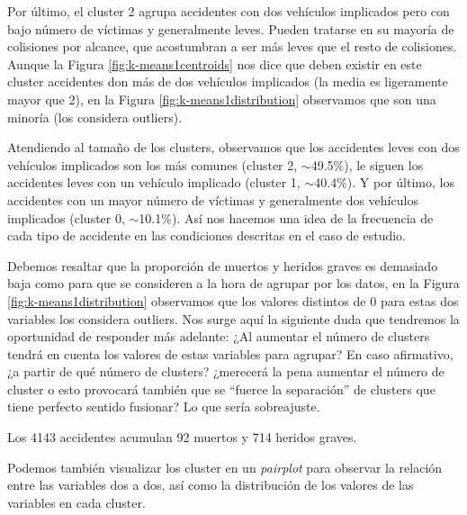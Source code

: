 \documentclass[oneside]{book}
\begin{document}
Por último, el cluster 2 agrupa accidentes con dos vehículos
implicados pero con bajo número de víctimas y generalmente
leves. Pueden tratarse en su mayoría de colisiones por alcance, que
acostumbran a ser más leves que el resto de colisiones. Aunque la
Figura \ref{fig:k-means1centroids} nos dice que deben existir en este
cluster accidentes don más de dos vehículos implicados (la media es
ligeramente mayor que 2), en la Figura \ref{fig:k-means1distribution}
observamos que son una minoría (los considera outliers).

Atendiendo al tamaño de los clusters, observamos que los accidentes
leves con dos vehículos implicados son los más comunes (cluster 2,
$\sim$49.5\%), le siguen los accidentes leves con un vehículo
implicado (cluster 1, $\sim$40.4\%). Y por último, los accidentes con
un mayor número de víctimas y generalmente dos vehículos implicados
(cluster 0, $\sim$10.1\%). Así nos hacemos una idea de la frecuencia
de cada tipo de accidente en las condiciones descritas en el caso de
estudio.

Debemos resaltar que la proporción de muertos y heridos graves es
demasiado baja como para que se consideren a la hora de agrupar por
los datos, en la Figura \ref{fig:k-means1distribution} observamos que
los valores distintos de 0 para estas dos variables los considera
outliers. Nos surge aquí la siguiente duda que tendremos la
oportunidad de responder más adelante: ¿Al aumentar el número de
clusters tendrá en cuenta los valores de estas variables para agrupar?
En caso afirmativo, ¿a partir de qué número de clusters? ¿merecerá la
pena aumentar el número de cluster o esto provocará también que se
``fuerce la separación'' de clusters que tiene perfecto sentido
fusionar? Lo que sería sobreajuste.

Los 4143 accidentes acumulan 92 muertos y 714 heridos graves.

Podemos también visualizar los cluster en un \textit{pairplot} para
observar la relación entre las variables dos a dos, así como la
distribución de los valores de las variables en cada cluster.
\end{document}
